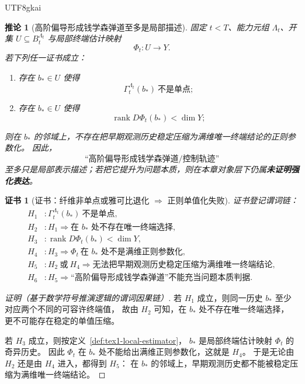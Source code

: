 \documentclass[12pt]{article}
\newtheorem{corollary}{推论}[section]
\newtheorem{Certificate}{证书}[section]
\begin{document}
\begin{CJK*}{UTF8}{gkai}
\begin{corollary}[高阶偏导形成钱学森弹道至多是局部描述]
\label{cor:tex1-high-order-not-essential}
固定 $t<T$、能力元组 $\Lambda_t$、开集 $U\subseteq B_t^{\Lambda_t}$ 与局部终端估计映射
\[
  \Phi_t:U\to Y.
\]
若下列任一证书成立：
\begin{enumerate}
  \item 存在 $b_\ast\in U$ 使得
  \[
    \Gamma_t^{\Lambda_t}(b_\ast)
    \ \text{不是单点};
  \]
  \item 存在 $b_\ast\in U$ 使得
  \[
    \operatorname{rank}D\Phi_t(b_\ast)<\dim Y;
  \]
\end{enumerate}
则在 $b_\ast$ 的邻域上，不存在把早期观测历史稳定压缩为满维唯一终端结论的正则参数化。
因此，
\[
  \text{“高阶偏导形成钱学森弹道/控制轨迹”}
\]
至多只是局部表示描述；若把它提升为问题本质，则在本章对象层下仍属\textbf{未证明强化表达}。
\end{corollary}

\begin{Certificate}[证书：纤维非单点或雅可比退化 $\Rightarrow$ 正则单值化失败]
\label{cert:tex1-high-order-not-essential}
证书登记谓词链：
\[
\begin{aligned}
  H_1 &: \Gamma_t^{\Lambda_t}(b_\ast)\ \text{不是单点},\\
  H_2 &: H_1\Rightarrow \text{在 }b_\ast\text{ 处不存在唯一终端选择},\\
  H_3 &: \operatorname{rank}D\Phi_t(b_\ast)<\dim Y,\\
  H_4 &: H_3\Rightarrow \Phi_t\ \text{在 }b_\ast\text{ 处不是满维正则参数化},\\
  H_5 &: H_2\ \text{或}\ H_4\Rightarrow \text{无法把早期观测历史稳定压缩为满维唯一终端结论},\\
  H_6 &: H_5\Rightarrow \text{“高阶偏导形成钱学森弹道”不能充当问题本质判据}.
\end{aligned}
\]
\end{Certificate}

\begin{proof}[证明（基于数学符号推演逻辑的谓词因果链）]
若 \(H_1\) 成立，则同一历史 $b_\ast$ 至少对应两个不同的可容许终端值，
故由 \(H_2\) 可知，在 $b_\ast$ 处不存在唯一终端选择，
更不可能存在稳定的单值压缩。

若 \(H_3\) 成立，则按定义~\ref{def:tex1-local-estimator}，
$b_\ast$ 是局部终端估计映射 $\Phi_t$ 的奇异历史。
因此 $\Phi_t$ 在 $b_\ast$ 处不能给出满维正则参数化，这就是 \(H_4\)。
于是无论由 \(H_2\) 还是由 \(H_4\) 进入，都得到 \(H_5\)：
在 $b_\ast$ 的邻域上，早期观测历史都不能被稳定压缩为满维唯一终端结论。


\end{proof}
\end{CJK*}
\end{document}
